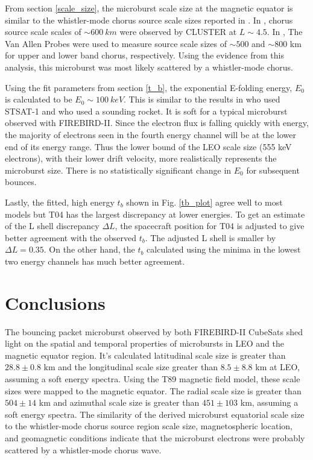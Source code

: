 \documentclass[draft,linenumbers]{agujournal}
\begin{document}
From section \ref{scale_size}, the microburst scale size at the magnetic equator is similar to the whistler-mode chorus source scale sizes reported in \citet{Agapitov11b, Agapitov17a}. In \citet{Agapitov11b}, chorus source scale scales of $\sim 600 \ km$ were observed by CLUSTER at $L \sim 4.5$. In \citet{Agapitov17a}, The Van Allen Probes were used to measure source scale sizes of $\sim 500$ and $\sim 800$ km for upper and lower band chorus, respectively. Using the evidence from this analysis, this microburst was most likely scattered by a whistler-mode chorus.

Using the fit parameters from section \ref{t_b}, the exponential E-folding energy, $E_0$ is calculated to be $E_0 \sim 100 \ keV$. This is similar to the results in \citet{Lee05} who used STSAT-1 and \citet{Datta1997} who used a sounding rocket. It is soft for a typical microburst observed with FIREBIRD-II. Since the electron flux is falling quickly with energy, the majority of electrons seen in the fourth energy channel will be at the lower end of its energy range. Thus the lower bound of the LEO scale size (555 keV electrons), with their lower drift velocity, more realistically represents the microburst size. There is no statistically significant change in $E_0$ for subsequent bounces.

Lastly, the fitted, high energy $t_b$ shown in Fig. \ref{tb_plot} agree well to most models but T04 has the largest discrepancy at lower energies. To get an estimate of the L shell discrepancy $\Delta L$, the spacecraft position for T04 is adjusted to give better agreement with the observed $t_b$. The adjusted L shell is smaller by $\Delta L = 0.35$. On the other hand, the $t_b$ calculated using the minima in the lowest two energy channels has much better agreement.

\section{Conclusions}
The bouncing packet microburst observed by both FIREBIRD-II CubeSats shed light on the spatial and temporal properties of microbursts in LEO and the magnetic equator region. It's calculated latitudinal scale size is greater than $28.8 \pm 0.8$ km and the longitudinal scale size greater than $8.5 \pm 8.8$ km at LEO, assuming a soft energy spectra. Using the T89 magnetic field model, these scale sizes were mapped to the magnetic equator. The radial scale size is greater than $504 \pm​ 14$ km and azimuthal scale size is greater than $451 \pm 103$ km, assuming a soft energy spectra. The similarity of the derived microburst equatorial scale size to the whistler-mode chorus source region scale size, magnetospheric location, and geomagnetic conditions indicate that the microburst electrons were probably scattered by a whistler-mode chorus wave.
\end{document}
